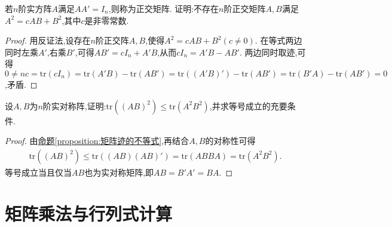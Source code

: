 \documentclass[lang=cn,newtx,10pt,scheme=chinese]{elegantbook}
\begin{document}
\begin{example}
若\(n\)阶实方阵\(A\)满足\(AA' = I_n\),则称为正交矩阵. 证明:不存在\(n\)阶正交矩阵\(A,B\)满足\(A^2 = cAB + B^2\),其中\(c\)是非零常数.
\end{example}
\begin{proof}
用反证法,设存在\(n\)阶正交阵\(A,B\),使得\(A^2 = cAB + B^2(c\neq0)\). 在等式两边同时左乘\(A'\),右乘\(B'\),可得\(AB' = cI_n + A'B\),从而\(cI_n = A'B - AB'\). 两边同时取迹,可得\(0\ne nc=\text{tr}(cI_n)=\text{tr}(A'B)-\text{tr}(AB')=\text{tr}((A'B)') - \text{tr}(AB')=\text{tr}(B'A)-\text{tr}(AB') = 0\),矛盾.
\end{proof}
    
\begin{example}
设\(A,B\)为\(n\)阶实对称阵,证明:\(\text{tr}((AB)^2)\leq\text{tr}(A^2B^2)\),并求等号成立的充要条件.
\end{example}
\begin{proof}
由\hyperref[proposition:矩阵迹的不等式]{命题\ref{proposition:矩阵迹的不等式}},再结合$A,B$的对称性可得
\begin{align*}
    \mathrm{tr}\left( \left( AB \right) ^2 \right) \leqslant \mathrm{tr}\left( \left( AB \right) \left( AB \right) \prime \right) =\mathrm{tr}\left( ABBA \right) =\mathrm{tr}\left( A^2B^2 \right) .
\end{align*}
等号成立当且仅当$AB$也为实对称矩阵,即\(AB = B'A'=BA\).
\end{proof}


\section{矩阵乘法与行列式计算}
\end{document}
